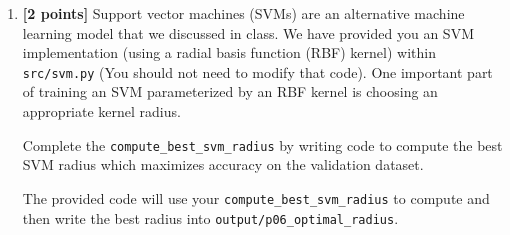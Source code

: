 \documentclass[11pt]{article}
\newcommand{\code}[1]{\nolinkurl{#1}}
\begin{document}
\begin{enumerate}
The provided code will print out the resulting indicative tokens and then save them to \code{output/p06_top_indicative_words}.
\item \textbf{[2 points]} Support vector machines (SVMs) are an alternative machine learning model that we discussed in class. We have provided you an SVM implementation (using a radial basis function (RBF) kernel) within \code{src/svm.py} (You should not need to modify that code). One important part of training an SVM parameterized by an RBF kernel is choosing an appropriate kernel radius.

Complete the \code{compute_best_svm_radius} by writing code to compute the best SVM radius which maximizes accuracy on the validation dataset.

The provided code will use your \code{compute_best_svm_radius} to compute and then write the best radius into \code{output/p06_optimal_radius}.
\end{enumerate}
\end{document}

